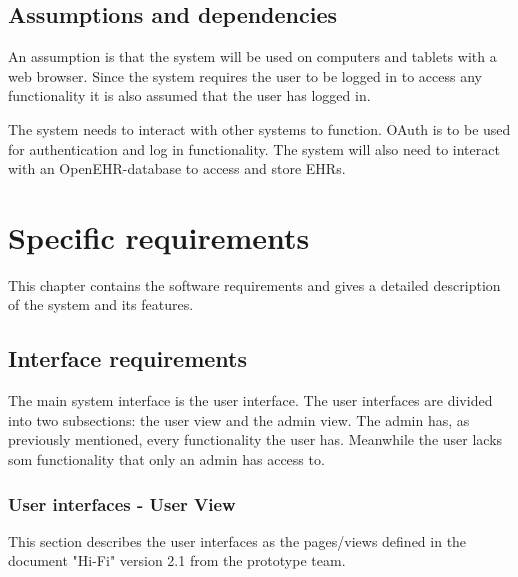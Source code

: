 \documentclass{scrreprt}
\begin{document}
\section{Assumptions and dependencies}
An assumption is that the system will be used on computers and tablets with a web browser. Since the system requires the user to be logged in to access any functionality it is also assumed that the user has logged in.

The system needs to interact with other systems to function. OAuth is to be used for authentication and log in functionality. The system will also need to interact with an OpenEHR-database to access and store EHRs. 



\chapter{Specific requirements}
This chapter contains the software requirements and gives a detailed
description of the system and its features. 

\section{Interface requirements}
The main system interface is the user interface. The user interfaces are divided into two subsections: the user view and the admin view. The admin has, as previously mentioned, every functionality the user has. Meanwhile the user lacks som functionality that only an admin has access to. 

\subsection{User interfaces -  User View}
This section describes the user interfaces as the pages/views defined in the document "Hi-Fi" version 2.1 from the prototype team.
\end{document}
